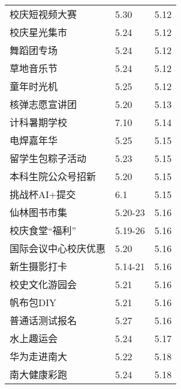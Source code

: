 \documentclass[letterpaper, 12pt]{article}
\begin{document}
\begin{multicols}{2}
{\begin{longtable}{|>{\centering\arraybackslash}m{}|m{}|m{}|}
    校庆短视频大赛 & 5.30 & 5.12\\
    校庆星光集市 & 5.24 & 5.12\\
    舞蹈团专场 & 5.24 & 5.12\\
    草地音乐节 & 5.24 & 5.12\\
    童年时光机 & 5.25 & 5.12\\
    核弹志愿宣讲团 & 5.20 & 5.13\\
    计科暑期学校 & 7.10 & 5.14\\
    电焊嘉年华 & 5.25 & 5.15\\
    留学生包粽子活动 & 5.23 & 5.15\\
    本科生院公众号招新 & 5.20 & 5.15\\
    挑战杯AI+提交 & 6.1 & 5.15\\
    仙林图书市集 & 5.20-23 & 5.16\\
    校庆食堂“福利” & 5.19-26 & 5.16\\
    国际会议中心校庆优惠 & 5.20 & 5.16\\
    新生摄影打卡 & 5.14-21 & 5.16\\
    校史文化游园会 & 5.21 & 5.16\\
    帆布包DIY & 5.21 & 5.16\\
    普通话测试报名 & 5.27 & 5.16\\
    水上趣运会 & 5.24 & 5.17\\
    华为走进南大 & 5.22 & 5.18\\
    南大健康彩跑 & 5.24 & 5.18\\
    \hline
\end{longtable}
\unskip
\unpenalty
\unpenalty}\unvbox\colbbox
\end{multicols}
\end{document}
